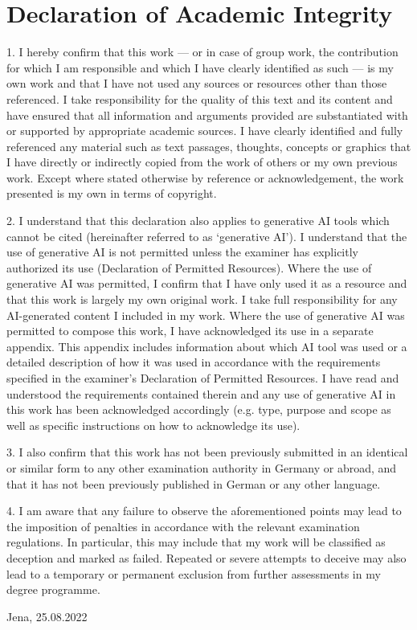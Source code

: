 \documentclass[12pt, a4paper]{report}
\begin{document}
\chapter*{Declaration of Academic Integrity}
\footnotesize
1. I hereby confirm that this work — or in case of group work, the contribution for which I am
responsible and which I have clearly identified as such — is my own work and that I have not used
any sources or resources other than those referenced. 
I take responsibility for the quality of this text and its content and have ensured that all information and arguments provided are substantiated with or supported by appropriate academic sources. 
I have clearly identified and fully referenced any material such as text passages, thoughts, concepts or graphics that I have directly or indirectly copied from the work of others or my own previous work. 
Except where stated otherwise by reference or acknowledgement, the work presented is my own in terms of copyright.

2. I understand that this declaration also applies to generative AI tools which cannot be cited
(hereinafter referred to as ‘generative AI’).
I understand that the use of generative AI is not permitted unless the examiner has explicitly
authorized its use (Declaration of Permitted Resources).
Where the use of generative AI was permitted, I confirm that I have only used it as a resource and that this work is largely my own original work.
I take full responsibility for any AI-generated content I included in my work.
Where the use of generative AI was permitted to compose this work, I have acknowledged its use
in a separate appendix.
This appendix includes information about which AI tool was used or a detailed description of how it was used in accordance with the requirements specified in the examiner’s Declaration of Permitted Resources.
I have read and understood the requirements contained therein and any use of generative AI in this
work has been acknowledged accordingly (e.g. type, purpose and scope as well as specific
instructions on how to acknowledge its use).

3. I also confirm that this work has not been previously submitted in an identical or similar form to
any other examination authority in Germany or abroad, and that it has not been previously
published in German or any other language.

4. I am aware that any failure to observe the aforementioned points may lead to the imposition of
penalties in accordance with the relevant examination regulations.
In particular, this may include that my work will be classified as deception and marked as failed. Repeated or severe attempts to deceive may also lead to a temporary or permanent exclusion from further assessments in my degree programme.

\vspace{50pt}

Jena, 25.08.2022
\end{document}
